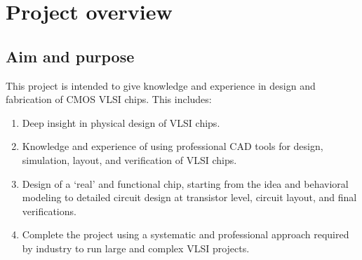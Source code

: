 \section{Project overview}


\subsection{Aim and purpose}
This project is intended to give knowledge and experience in design and fabrication of CMOS VLSI chips. This includes:
\begin{enumerate}
 \item Deep insight in physical design of VLSI chips.
 \item Knowledge and experience of using professional CAD tools for design, simulation, layout, and verification of VLSI chips.
 \item Design of a ‘real’ and functional chip, starting from the idea and behavioral modeling to detailed circuit design at transistor level, circuit layout, and final verifications.
 \item Complete the project using a systematic and professional approach required by industry to run large and complex VLSI projects.
\end{enumerate}